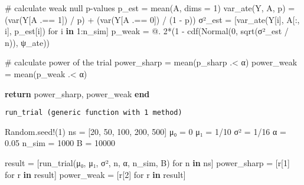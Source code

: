 \documentclass[
  11pt,
  letterpaper,
  DIV=11,
  numbers=noendperiod]{scrartcl}
\newenvironment{Shaded}{}{}
\newcommand{\BuiltInTok}[1]{\textcolor[rgb]{0.84,0.36,0.05}{#1}}
\newcommand{\CommentTok}[1]{\textcolor[rgb]{0.57,0.51,0.45}{#1}}
\newcommand{\ControlFlowTok}[1]{\textcolor[rgb]{0.80,0.14,0.11}{\textbf{#1}}}
\newcommand{\FloatTok}[1]{\textcolor[rgb]{0.96,0.45,0.00}{#1}}
\newcommand{\FunctionTok}[1]{\textcolor[rgb]{0.41,0.62,0.42}{#1}}
\newcommand{\KeywordTok}[1]{\textcolor[rgb]{0.24,0.22,0.21}{\textbf{#1}}}
\newcommand{\NormalTok}[1]{\textcolor[rgb]{0.24,0.22,0.21}{#1}}
\newcommand{\OperatorTok}[1]{\textcolor[rgb]{0.24,0.22,0.21}{#1}}
\begin{document}
\begin{Shaded}
\begin{Highlighting}[]
  \CommentTok{\# calculate weak null p{-}values}
\NormalTok{  p\_est }\OperatorTok{=} \FunctionTok{mean}\NormalTok{(A, dims }\OperatorTok{=} \FloatTok{1}\NormalTok{)}
  \FunctionTok{var\_ate}\NormalTok{(Y, A, p) }\OperatorTok{=}\NormalTok{ (}\FunctionTok{var}\NormalTok{(Y[A }\OperatorTok{.==} \FloatTok{1}\NormalTok{]) }\OperatorTok{/}\NormalTok{ p) }\OperatorTok{+}\NormalTok{ (}\FunctionTok{var}\NormalTok{(Y[A }\OperatorTok{.==} \FloatTok{0}\NormalTok{]) }\OperatorTok{/}\NormalTok{ (}\FloatTok{1} \OperatorTok{{-}}\NormalTok{ p))}
\NormalTok{  σ²\_est }\OperatorTok{=}\NormalTok{ [}\FunctionTok{var\_ate}\NormalTok{(Y[i], A[}\OperatorTok{:}\NormalTok{, i], p\_est[i]) for i }\KeywordTok{in} \FloatTok{1}\OperatorTok{:}\NormalTok{n\_sim]}
\NormalTok{  p\_weak }\OperatorTok{=}\NormalTok{ @. }\FloatTok{2}\FunctionTok{*}\NormalTok{(}\FloatTok{1} \OperatorTok{{-}} \FunctionTok{cdf}\NormalTok{(}\FunctionTok{Normal}\NormalTok{(}\FloatTok{0}\NormalTok{, }\FunctionTok{sqrt}\NormalTok{(σ²\_est }\OperatorTok{/}\NormalTok{ n)), ψ\_ate))}

  \CommentTok{\# calculate power of the trial}
\NormalTok{  power\_sharp }\OperatorTok{=} \FunctionTok{mean}\NormalTok{(p\_sharp }\OperatorTok{.\textless{}}\NormalTok{ α)}
\NormalTok{  power\_weak }\OperatorTok{=} \FunctionTok{mean}\NormalTok{(p\_weak }\OperatorTok{.\textless{}}\NormalTok{ α)}

  \ControlFlowTok{return}\NormalTok{ power\_sharp, power\_weak}
\ControlFlowTok{end}
\end{Highlighting}
\end{Shaded}

\begin{verbatim}
run_trial (generic function with 1 method)
\end{verbatim}

\begin{Shaded}
\begin{Highlighting}[]
\BuiltInTok{Random}\NormalTok{.}\FunctionTok{seed!}\NormalTok{(}\FloatTok{1}\NormalTok{)}
\NormalTok{ns }\OperatorTok{=}\NormalTok{ [}\FloatTok{20}\NormalTok{, }\FloatTok{50}\NormalTok{, }\FloatTok{100}\NormalTok{, }\FloatTok{200}\NormalTok{, }\FloatTok{500}\NormalTok{]}
\NormalTok{μ₀ }\OperatorTok{=} \FloatTok{0}
\NormalTok{μ₁ }\OperatorTok{=} \FloatTok{1}\OperatorTok{/}\FloatTok{10}
\NormalTok{σ² }\OperatorTok{=} \FloatTok{1}\OperatorTok{/}\FloatTok{16}
\NormalTok{α }\OperatorTok{=} \FloatTok{0.05}
\NormalTok{n\_sim }\OperatorTok{=} \FloatTok{1000}
\NormalTok{B }\OperatorTok{=} \FloatTok{10000}

\NormalTok{result }\OperatorTok{=}\NormalTok{ [}\FunctionTok{run\_trial}\NormalTok{(μ₀, μ₁, σ², n, α, n\_sim, B) for n }\KeywordTok{in}\NormalTok{ ns]}
\NormalTok{power\_sharp }\OperatorTok{=}\NormalTok{ [r[}\FloatTok{1}\NormalTok{] for r }\KeywordTok{in}\NormalTok{ result]}
\NormalTok{power\_weak }\OperatorTok{=}\NormalTok{ [r[}\FloatTok{2}\NormalTok{] for r }\KeywordTok{in}\NormalTok{ result]}
\end{Highlighting}
\end{Shaded}
\end{document}
